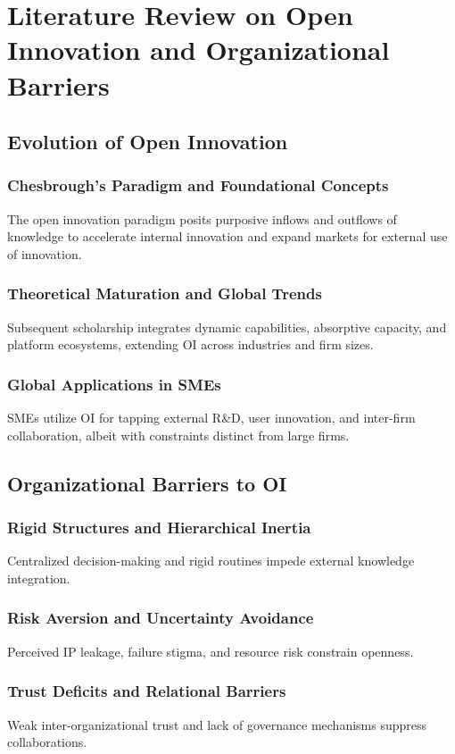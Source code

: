 \chapter{Literature Review on Open Innovation and Organizational Barriers}\label{ch:literature}

\section{Evolution of Open Innovation}
\subsection{Chesbrough's Paradigm and Foundational Concepts}
The open innovation paradigm posits purposive inflows and outflows of knowledge to accelerate internal innovation and expand markets for external use of innovation.

\subsection{Theoretical Maturation and Global Trends}
Subsequent scholarship integrates dynamic capabilities, absorptive capacity, and platform ecosystems, extending OI across industries and firm sizes.

\subsection{Global Applications in SMEs}
SMEs utilize OI for tapping external R\&D, user innovation, and inter-firm collaboration, albeit with constraints distinct from large firms.

\section{Organizational Barriers to OI}
\subsection{Rigid Structures and Hierarchical Inertia}
Centralized decision-making and rigid routines impede external knowledge integration.

\subsection{Risk Aversion and Uncertainty Avoidance}
Perceived IP leakage, failure stigma, and resource risk constrain openness.

\subsection{Trust Deficits and Relational Barriers}
Weak inter-organizational trust and lack of governance mechanisms suppress collaborations.

